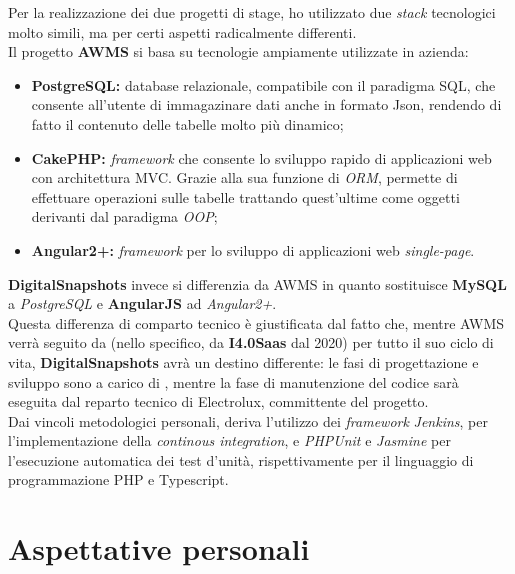 Per la realizzazione dei due progetti di stage, ho utilizzato due \textit{stack} tecnologici molto simili, ma per certi aspetti radicalmente differenti.\\
Il progetto \textbf{AWMS} si basa su tecnologie ampiamente utilizzate in azienda: 
\begin{itemize}
\item \textbf{PostgreSQL:} database relazionale, compatibile con il paradigma SQL, che consente all'utente di immagazinare dati anche in formato Json, rendendo di fatto il contenuto delle tabelle molto più dinamico;
\item \textbf{CakePHP:} \textit{framework} che consente lo sviluppo rapido di applicazioni web con architettura MVC. Grazie alla sua funzione di \textit{ORM}, permette di effettuare operazioni sulle tabelle trattando quest'ultime come oggetti derivanti dal paradigma \textit{OOP};
\item \textbf{Angular2+:} \textit{framework} per lo sviluppo di applicazioni web \textit{single-page}.
\end{itemize}
\textbf{DigitalSnapshots} invece si differenzia da AWMS in quanto sostituisce \textbf{MySQL} a \textit{PostgreSQL} e \textbf{AngularJS} ad \textit{Angular2+}.\\
Questa differenza di comparto tecnico è giustificata dal fatto che, mentre AWMS verrà seguito da \AD{} (nello specifico, da \textbf{I4.0Saas} dal 2020) per tutto il suo ciclo di vita, \textbf{DigitalSnapshots} avrà un destino differente: le fasi di progettazione e sviluppo sono a carico di \AD{}, mentre la fase di manutenzione del codice sarà eseguita dal reparto tecnico di Electrolux, committente del progetto.\\
Dai vincoli metodologici personali, deriva l'utilizzo dei \textit{framework} \textit{Jenkins}, per l'implementazione della \textit{continous integration}, e \textit{PHPUnit} e \textit{Jasmine} per l'esecuzione automatica dei test d'unità, rispettivamente per il linguaggio di programmazione PHP e Typescript.
\section{Aspettative personali}
